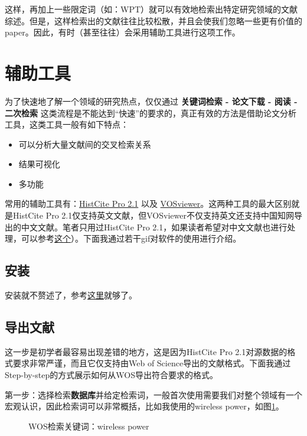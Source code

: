 \documentclass[UTF8,oneside]{ctexbook}
\begin{document}
这样，再加上一些限定词（如：WPT）就可以有效地检索出特定研究领域的文献综述。但是，这样检索出的文献往往比较松散，并且会使我们忽略一些更有价值的paper。因此，有时（甚至往往）会采用辅助工具进行这项工作。

\section{辅助工具}
为了快速地了解一个领域的研究热点，仅仅通过 {\bf 关键词检索 - 论文下载 - 阅读 - 二次检索} 这类流程是不能达到“快速”的要求的，真正有效的方法是借助论文分析工具，这类工具一般有如下特点：

\begin{itemize}
	\item 可以分析大量文献间的交叉检索关系
	\item 结果可视化
	\item 多功能
\end{itemize}

常用的辅助工具有：\href{https://zhuanlan.zhihu.com/p/20902898}{HistCite Pro 2.1} 以及 \href{https://zhuanlan.zhihu.com/p/30970993}{VOSviewer}。这两种工具的最大区别就是HistCite Pro 2.1仅支持英文文献，但VOSviewer不仅支持英文还支持中国知网导出的中文文献。笔者只用过HistCite Pro 2.1，如果读者希望对中文文献也进行处理，可以参考\href{https://www.jianshu.com/p/e20f3f1d17d8}{这个}）。下面我通过若干gif对软件的使用进行介绍。
\subsection{安装}
安装就不赘述了，参考\href{https://zhuanlan.zhihu.com/p/20902898}{这里}就够了。
\subsection{导出文献}
这一步是初学者最容易出现差错的地方，这是因为HistCite Pro 2.1对源数据的格式要求非常严谨，而且它仅支持由Web of Science导出的文献格式。下面我通过Step-by-step的方式展示如何从WOS导出符合要求的格式。

第一步：选择检索{\bf 数据库}并给定检索词，一般首次使用需要我们对整个领域有一个宏观认识，因此检索词可以非常概括，比如我使用的wireless power，如图\ref{fig:1}。

\begin{figure}[!htb]
	\centering
	\vspace{-0.3cm}
	\caption{WOS检索关键词：wireless power}\label{fig:1}
\end{figure}
\end{document}
